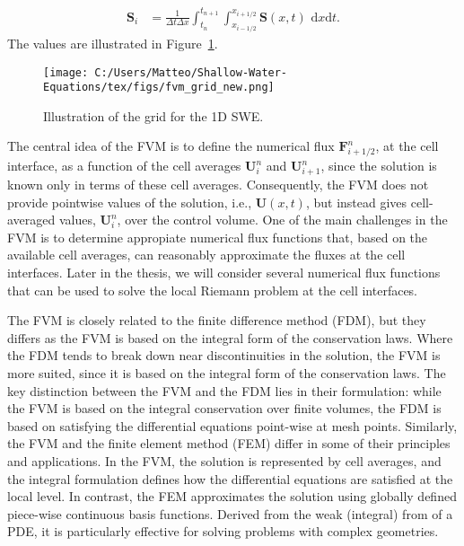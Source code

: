 \begin{align*}
    \mathbf{S}_i &= \frac{1}{\Delta t \Delta x} \int_{t_n}^{t_{n+1}} \int_{x_{i-1/2}}^{x_{i+1/2}} \mathbf{S}(x,t) \text{ d}x\text{d}t.
\end{align*}
The values are illustrated in Figure~\ref{fig:10_3}.
\begin{figure}[H]
    \centering
    \texttt{[image: C:/Users/Matteo/Shallow-Water-Equations/tex/figs/fvm\_grid\_new.png]}
    \caption{Illustration of the grid for the 1D SWE.}\label{fig:10_3}
\end{figure}
The central idea of the FVM is to define the numerical flux $\mathbf{F}_{i+1/2}^n$, at the cell interface, as a function of the cell averages $\mathbf{U}_i^n$ and $\mathbf{U}_{i+1}^n$, since the solution is known only in terms of these cell averages.
Consequently, the FVM does not provide pointwise values of the solution, i.e., $\mathbf{U}(x,t)$, but instead gives cell-averaged values, $\mathbf{U}_i^n$, over the control volume.
One of the main challenges in the FVM is to determine appropiate numerical flux functions that, based on the available cell averages, can reasonably approximate the fluxes at the cell interfaces. 
Later in the thesis, we will consider several numerical flux functions that can be used to solve the local Riemann problem at the cell interfaces.

The FVM is closely related to the finite difference method (FDM), but they differs as the FVM is based on the integral form of the conservation laws.
Where the FDM tends to break down near discontinuities in the solution, the FVM is more suited, since it is based on the integral form of the conservation laws.
The key distinction between the FVM and the FDM lies in their formulation: while the FVM is based on the integral conservation over finite volumes, the FDM is based on satisfying the differential equations point-wise at mesh points.
Similarly, the FVM and the finite element method (FEM) differ in some of their principles and applications.
In the FVM, the solution is represented by cell averages, and the integral formulation defines how the differential equations are satisfied at the local level.
In contrast, the FEM approximates the solution using globally defined piece-wise continuous basis functions.
Derived from the weak (integral) from of a PDE, it is particularly effective for solving problems with complex geometries.

